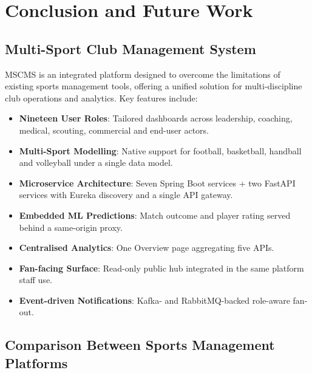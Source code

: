 \documentclass[12pt,a4paper,oneside]{report}
\begin{document}
\chapter{Conclusion and Future Work}
\label{ch:conclusion}

\section*{Multi-Sport Club Management System}

MSCMS is an integrated platform designed to overcome the limitations
of existing sports management tools, offering a unified solution for
multi-discipline club operations and analytics. Key features include:
\begin{itemize}[leftmargin=*]
  \item \textbf{Nineteen User Roles}: Tailored dashboards across
        leadership, coaching, medical, scouting, commercial and
        end-user actors.
  \item \textbf{Multi-Sport Modelling}: Native support for football,
        basketball, handball and volleyball under a single data
        model.
  \item \textbf{Microservice Architecture}: Seven Spring Boot
        services + two FastAPI services with Eureka discovery and a
        single API gateway.
  \item \textbf{Embedded ML Predictions}: Match outcome and player
        rating served behind a same-origin proxy.
  \item \textbf{Centralised Analytics}: One Overview page aggregating
        five APIs.
  \item \textbf{Fan-facing Surface}: Read-only public hub integrated
        in the same platform staff use.
  \item \textbf{Event-driven Notifications}: Kafka- and
        RabbitMQ-backed role-aware fan-out.
\end{itemize}

\section{Comparison Between Sports Management Platforms}
\label{sec:comparison-table}
\end{document}
